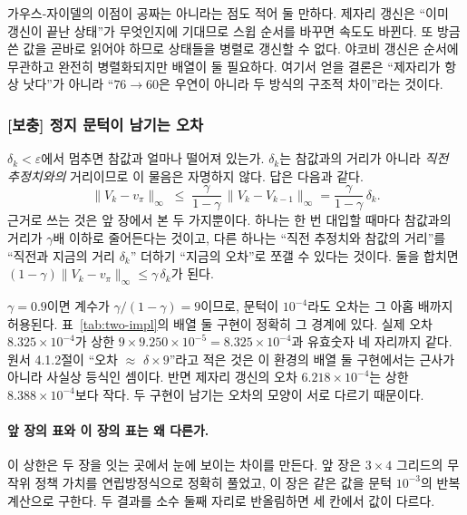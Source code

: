\documentclass[11pt,a4paper]{article}
\begin{document}
가우스-자이델의 이점이 공짜는 아니라는 점도 적어 둘 만하다. 제자리 갱신은 ``이미 갱신이 끝난 상태''가
무엇인지에 기대므로 스윕 순서를 바꾸면 속도도 바뀐다. 또 방금 쓴 값을 곧바로 읽어야 하므로 상태들을
병렬로 갱신할 수 없다. 야코비 갱신은 순서에 무관하고 완전히 병렬화되지만 배열이 둘 필요하다. 여기서
얻을 결론은 ``제자리가 항상 낫다''가 아니라 ``$76\to60$은 우연이 아니라 두 방식의 구조적 차이''라는
것이다.

\subsubsection{[보충] 정지 문턱이 남기는 오차}
\label{sec:threshold}

$\delta_k<\varepsilon$에서 멈추면 참값과 얼마나 떨어져 있는가. $\delta_k$는 참값과의 거리가 아니라
\emph{직전 추정치와의} 거리이므로 이 물음은 자명하지 않다. 답은 다음과 같다.
\begin{equation}
  \bigl\|V_k - v_\pi\bigr\|_\infty
  \;\le\; \frac{\gamma}{1-\gamma}\,\bigl\|V_k - V_{k-1}\bigr\|_\infty
  = \frac{\gamma}{1-\gamma}\,\delta_k .
  \label{eq:stop-bound}
\end{equation}
근거로 쓰는 것은 앞 장에서 본 두 가지뿐이다. 하나는 한 번 대입할 때마다 참값과의 거리가 $\gamma$배
이하로 줄어든다는 것이고, 다른 하나는 ``직전 추정치와 참값의 거리''를 ``직전과 지금의 거리 $\delta_k$''
더하기 ``지금의 오차''로 쪼갤 수 있다는 것이다. 둘을 합치면
$(1-\gamma)\|V_k-v_\pi\|_\infty \le \gamma\,\delta_k$가 된다.

$\gamma=0.9$이면 계수가 $\gamma/(1-\gamma)=9$이므로, 문턱이 $10^{-4}$라도 오차는 그 아홉 배까지
허용된다. 표~\ref{tab:two-impl}의 배열 둘 구현이 정확히 그 경계에 있다. 실제 오차
$8.325\times10^{-4}$가 상한 $9\times9.250\times10^{-5}=8.325\times10^{-4}$과 유효숫자 네 자리까지 같다.
원서 4.1.2절이 ``오차 $\approx$ $\delta\times9$''라고 적은 것은 이 환경의 배열 둘 구현에서는 근사가
아니라 사실상 등식인 셈이다. 반면 제자리 갱신의 오차 $6.218\times10^{-4}$는 상한
$8.388\times10^{-4}$보다 작다. 두 구현이 남기는 오차의 모양이 서로 다르기 때문이다.

\paragraph{앞 장의 표와 이 장의 표는 왜 다른가.}
이 상한은 두 장을 잇는 곳에서 눈에 보이는 차이를 만든다. 앞 장은 $3\times4$ 그리드의 무작위 정책
가치를 연립방정식으로 정확히 풀었고, 이 장은 같은 값을 문턱 $10^{-3}$의 반복 계산으로 구한다. 두
결과를 소수 둘째 자리로 반올림하면 세 칸에서 값이 다르다.
\end{document}
